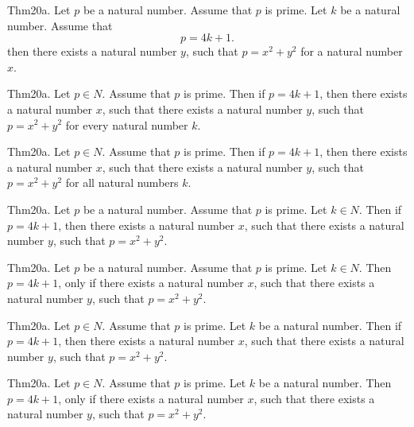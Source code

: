 \documentclass{article}
\begin{document}
Thm20a. Let $p$ be a natural number. Assume that $p$ is prime. Let $k$ be a natural number. Assume that $$p = 4 k + 1.$$ then there exists a natural number $y$, such that $p = x ^{ 2}+ y ^{ 2}$ for a natural number $x$.

Thm20a. Let $p \in N$. Assume that $p$ is prime. Then if $p = 4 k + 1$, then there exists a natural number $x$, such that there exists a natural number $y$, such that $p = x ^{ 2}+ y ^{ 2}$ for every natural number $k$.

Thm20a. Let $p \in N$. Assume that $p$ is prime. Then if $p = 4 k + 1$, then there exists a natural number $x$, such that there exists a natural number $y$, such that $p = x ^{ 2}+ y ^{ 2}$ for all natural numbers $k$.

Thm20a. Let $p$ be a natural number. Assume that $p$ is prime. Let $k \in N$. Then if $p = 4 k + 1$, then there exists a natural number $x$, such that there exists a natural number $y$, such that $p = x ^{ 2}+ y ^{ 2}$.

Thm20a. Let $p$ be a natural number. Assume that $p$ is prime. Let $k \in N$. Then $p = 4 k + 1$, only if there exists a natural number $x$, such that there exists a natural number $y$, such that $p = x ^{ 2}+ y ^{ 2}$.

Thm20a. Let $p \in N$. Assume that $p$ is prime. Let $k$ be a natural number. Then if $p = 4 k + 1$, then there exists a natural number $x$, such that there exists a natural number $y$, such that $p = x ^{ 2}+ y ^{ 2}$.

Thm20a. Let $p \in N$. Assume that $p$ is prime. Let $k$ be a natural number. Then $p = 4 k + 1$, only if there exists a natural number $x$, such that there exists a natural number $y$, such that $p = x ^{ 2}+ y ^{ 2}$.
\end{document}

